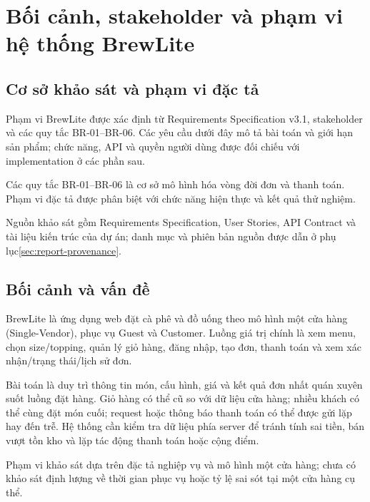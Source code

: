\section{Bối cảnh, stakeholder và phạm vi hệ thống BrewLite}
\label{sec:context-and-scope}
\subsection{Cơ sở khảo sát và phạm vi đặc tả}

Phạm vi BrewLite được xác định từ Requirements Specification v3.1, stakeholder và các quy tắc BR-01--BR-06. Các yêu cầu dưới đây mô tả bài toán và giới hạn sản phẩm; chức năng, API và quyền người dùng được đối chiếu với implementation ở các phần sau.
\par

Các quy tắc BR-01--BR-06 là cơ sở mô hình hóa vòng đời đơn và thanh toán. Phạm vi đặc tả được phân biệt với chức năng hiện thực và kết quả thử nghiệm.
\par

Nguồn khảo sát gồm Requirements Specification, User Stories, API Contract và tài liệu kiến trúc của dự án; danh mục và phiên bản nguồn được dẫn ở phụ lục\ref{sec:report-provenance}.
\par

\subsection{Bối cảnh và vấn đề}

BrewLite là ứng dụng web đặt cà phê và đồ uống theo mô hình một cửa hàng (Single-Vendor), phục vụ Guest và Customer. Luồng giá trị chính là xem menu, chọn size/topping, quản lý giỏ hàng, đăng nhập, tạo đơn, thanh toán và xem xác nhận/trạng thái/lịch sử đơn.
\par

Bài toán là duy trì thông tin món, cấu hình, giá và kết quả đơn nhất quán xuyên suốt luồng đặt hàng. Giỏ hàng có thể cũ so với dữ liệu cửa hàng; nhiều khách có thể cùng đặt món cuối; request hoặc thông báo thanh toán có thể được gửi lặp hay đến trễ. Hệ thống cần kiểm tra dữ liệu phía server để tránh tính sai tiền, bán vượt tồn kho và lặp tác động thanh toán hoặc cộng điểm.
\par

Phạm vi khảo sát dựa trên đặc tả nghiệp vụ và mô hình một cửa hàng; chưa có khảo sát định lượng về thời gian phục vụ hoặc tỷ lệ sai sót tại một cửa hàng cụ thể.
\par

